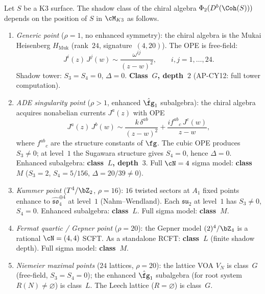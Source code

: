 \begin{proposition}
\label{prop:k3-shadow-class-landscape}
\ClaimStatusProvedHere
Let $S$ be a K3 surface.  The shadow class of the chiral algebra
$\Phi_2(D^b(\Coh(S)))$ depends on the position of $S$ in $\cM_{K3}$
as follows.
\begin{enumerate}[label=(\roman*)]
\item \emph{Generic point} ($\rho = 1$, no enhanced symmetry):
 the chiral algebra is the Mukai Heisenberg $H_{\mathrm{Muk}}$
 (rank~$24$, signature~$(4,20)$).  The OPE is free-field:
 \[
  J^i(z)\,J^j(w) \sim \frac{\omega^{ij}}{(z-w)^2},
  \qquad i,j = 1,\dotsc,24.
 \]
 Shadow tower: $S_3 = S_4 = 0$, $\Delta = 0$.
 \textbf{Class~$G$, depth~$2$} (AP-CY12: full tower computation).

\item \emph{ADE singularity point} ($\rho > 1$, enhanced $\hat{\fg}_1$
 subalgebra): the chiral algebra acquires nonabelian currents
 $J^a(z)$ with OPE
 \[
  J^a(z)\,J^b(w) \sim \frac{k\,\delta^{ab}}{(z-w)^2}
  + \frac{if^{ab}{}_c\,J^c(w)}{z - w},
 \]
 where $f^{ab}{}_c$ are the structure constants of $\fg$.
 The cubic OPE produces $S_3 \neq 0$; at level~$1$ the Sugawara
 structure gives $S_4 = 0$, hence $\Delta = 0$.
 Enhanced subalgebra: \textbf{class~$L$, depth~$3$}.
 Full $\cN = 4$ sigma model: \textbf{class~$M$}
 ($S_3 = 2$, $S_4 = 5/156$, $\Delta = 20/39 \neq 0$).

\item \emph{Kummer point} ($T^4/\bZ_2$, $\rho = 16$):
 $16$ twisted sectors at $A_1$ fixed points enhance to
 $\hat{\mathfrak{so}}_4^{\oplus 4}$ at level~$1$ (Nahm--Wendland).
 Each $\hat{\mathfrak{su}}_2$ at level~$1$ has $S_3 \neq 0$,
 $S_4 = 0$.  Enhanced subalgebra: \textbf{class~$L$}.
 Full sigma model: \textbf{class~$M$}.

\item \emph{Fermat quartic / Gepner point} ($\rho = 20$):
 the Gepner model $(2)^4/\bZ_4$ is a rational $\cN = (4,4)$ SCFT.
 As a standalone RCFT: \textbf{class~$L$} (finite shadow depth).
 Full sigma model: \textbf{class~$M$}.

\item \emph{Niemeier maximal points} ($24$ lattices, $\rho = 20$):
 the lattice VOA $V_N$ is class~$G$ (free-field, $S_3 = S_4 = 0$);
 the enhanced $\hat{\fg}_1$ subalgebra (for root system $R(N) \neq
 \varnothing$) is class~$L$.  The Leech lattice ($R = \varnothing$)
 is class~$G$.
\end{enumerate}
\end{proposition}

